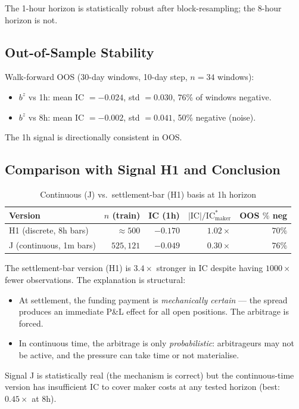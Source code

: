 \documentclass[12pt, a4paper]{article}
\theoremstyle{definition}
\newcommand{\IC}{\mathrm{IC}}
\begin{document}
The 1-hour horizon is statistically robust after block-resampling; the 8-hour
horizon is not.

\subsection{Out-of-Sample Stability}

Walk-forward OOS (30-day windows, 10-day step, $n = 34$ windows):
\begin{itemize}
  \item $b^z$ vs 1h: mean IC $= -0.024$, std $= 0.030$, 76\% of windows negative.
  \item $b^z$ vs 8h: mean IC $= -0.002$, std $= 0.041$, 50\% negative (noise).
\end{itemize}
The 1h signal is directionally consistent in OOS.

\subsection{Comparison with Signal H1 and Conclusion}

\begin{table}[H]
\centering
\caption{Continuous (J) vs.\ settlement-bar (H1) basis at 1h horizon}
\label{tab:e_vs_h1}
\begin{tabular}{lrrrr}
\toprule
Version & $n$ (train) & IC (1h) & $|\IC|/\IC^*_{\text{maker}}$ & OOS $\%$ neg \\
\midrule
H1 (discrete, 8h bars)       & $\approx 500$  & $-0.170$ & $1.02\times$ & $70\%$ \\
J (continuous, 1m bars)      & $525{,}121$    & $-0.049$ & $0.30\times$ & $76\%$ \\
\bottomrule
\end{tabular}
\end{table}

The settlement-bar version (H1) is $3.4\times$ stronger in IC despite having
$1000\times$ fewer observations.  The explanation is structural:
\begin{itemize}
  \item At settlement, the funding payment is \emph{mechanically certain} —
        the spread produces an immediate P\&L effect for all open positions.
        The arbitrage is forced.
  \item In continuous time, the arbitrage is only \emph{probabilistic}:
        arbitrageurs may not be active, and the pressure can take time or
        not materialise.
\end{itemize}
Signal J is statistically real (the mechanism is correct) but the
continuous-time version has insufficient IC to cover maker costs at any
tested horizon (best: $0.45\times$ at 8h).
\end{document}
